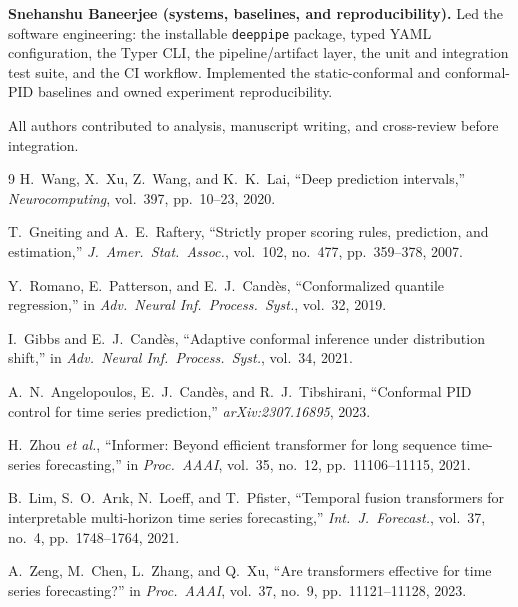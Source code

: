 \documentclass[conference]{IEEEtran}
\begin{document}
\textbf{Snehanshu Baneerjee (systems, baselines, and reproducibility).} Led the software
engineering: the installable \texttt{deeppipe} package, typed YAML configuration, the Typer CLI,
the pipeline/artifact layer, the unit and integration test suite, and the CI workflow. Implemented
the static-conformal and conformal-PID baselines and owned experiment reproducibility.

All authors contributed to analysis, manuscript writing, and cross-review before integration.

\begin{thebibliography}{9}
H.~Wang, X.~Xu, Z.~Wang, and K.~K.~Lai, ``Deep prediction intervals,''
\emph{Neurocomputing}, vol.~397, pp.~10--23, 2020.

T.~Gneiting and A.~E.~Raftery, ``Strictly proper scoring rules, prediction, and estimation,''
\emph{J.\ Amer.\ Stat.\ Assoc.}, vol.~102, no.~477, pp.~359--378, 2007.

Y.~Romano, E.~Patterson, and E.~J.~Cand\`es, ``Conformalized quantile regression,''
in \emph{Adv.\ Neural Inf.\ Process.\ Syst.}, vol.~32, 2019.

I.~Gibbs and E.~J.~Cand\`es, ``Adaptive conformal inference under distribution shift,''
in \emph{Adv.\ Neural Inf.\ Process.\ Syst.}, vol.~34, 2021.

A.~N.~Angelopoulos, E.~J.~Cand\`es, and R.~J.~Tibshirani, ``Conformal PID control for time series
prediction,'' \emph{arXiv:2307.16895}, 2023.

H.~Zhou \emph{et al.}, ``Informer: Beyond efficient transformer for long sequence time-series
forecasting,'' in \emph{Proc.\ AAAI}, vol.~35, no.~12, pp.~11106--11115, 2021.

B.~Lim, S.~O.~Ar{\i}k, N.~Loeff, and T.~Pfister, ``Temporal fusion transformers for interpretable
multi-horizon time series forecasting,'' \emph{Int.\ J.\ Forecast.}, vol.~37, no.~4,
pp.~1748--1764, 2021.

A.~Zeng, M.~Chen, L.~Zhang, and Q.~Xu, ``Are transformers effective for time series
forecasting?'' in \emph{Proc.\ AAAI}, vol.~37, no.~9, pp.~11121--11128, 2023.
\end{thebibliography}
\end{document}
